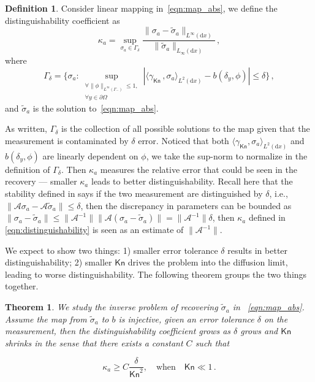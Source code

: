 \documentclass[english,reqno]{amsart}
\theoremstyle{plain}
\newtheorem{theorem}{Theorem}
\theoremstyle{definition} %
\newtheorem{definition}{Definition}
\newcommand{\rd}{\mathrm{d}}
\newcommand{\Kn}{\mathsf{Kn}}
\begin{document}
\begin{definition}%
Consider linear mapping in~\eqref{eqn:map_abs}, we define the distinguishability coefficient as
\begin{equation}\label{eqn:distinguishability}
\kappa_a =\sup_{\sigma_a \in\Gamma_\delta}\frac{\| \sigma_a - \tilde{\sigma}_a\|_{L^\infty(\rd{x})}}{\| \tilde{\sigma}_a\|_{L_\infty(\rd{x})}}\,,
\end{equation}
where
\[
\Gamma_\delta=\{ \sigma_a: \sup_{\substack{\forall \|\phi\|_{L^\infty(\Gamma_-)}\leq 1,\\ \forall y\in \partial\Omega}}|\langle\gamma_\Kn\,,\sigma_a\rangle_{L^2(\rd{x})} - b(\delta_y,\phi) | \leq \delta  \}\,,
\]
and $\tilde{\sigma}_a$ is the solution to~\eqref{eqn:map_abs}.
\end{definition}
As written, $\Gamma_\delta$ is the collection of all possible solutions to the map given that the measurement is contaminated by $\delta$ error. Noticed that both $\langle \gamma_{\Kn},\sigma_a \rangle_{L^2(\rd{x})}$ and $b(\delta_y,\phi)$ are linearly dependent on $\phi$, we take the sup-norm to normalize in the definition of $\Gamma_\delta$. Then $\kappa_a$ measures the relative error that could be seen in the recovery --- smaller $\kappa_a$ leads to better distinguishability. Recall here that the stability defined in \cite{Bal_review} says if the two measurement are distinguished by $\delta$, i.e., $\| \mathcal{A} \sigma_a - \mathcal{A} \tilde{\sigma}_a\| \leq \delta $, then the discrepancy in parameters can be bounded as $\| \sigma_a - \tilde{\sigma}_a\| \leq \| \mathcal{A}^{-1}\| \| \mathcal{A}(\sigma_a - \tilde{\sigma}_a)\| = \|\mathcal{A}^{-1}\| \delta$, then $\kappa_a$ defined in \eqref{eqn:distinguishability} is seen as an estimate of $\|\mathcal{A}^{-1}\|$.

We expect to show two things: 1) smaller error tolerance $\delta$ results in better distinguishability; 2) smaller $\Kn$ drives the problem into the diffusion limit, leading to worse distinguishability. The following theorem groups the two things together. 



\begin{theorem}\label{thm:Dis}
We study the inverse problem of recovering $\tilde{\sigma}_a$ in ~\eqref{eqn:map_abs}. Assume the map from $\tilde{\sigma}_a$ to $b$ is injective, given an error tolerance $\delta$ on the measurement, then the distinguishability coefficient grows as $\delta$ grows and $\Kn$ shrinks in the sense that there exists a constant $C$ such that

\begin{equation}\label{eqn:Dis}
\kappa_a \geq C\frac{\delta}{\Kn^2} ,\quad \text{when} \quad \Kn\ll 1\,.
\end{equation}

\end{theorem}
\end{document}
